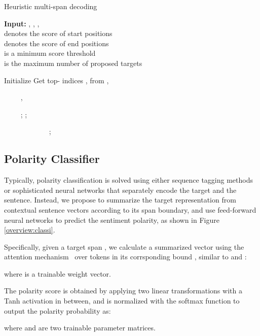 \documentclass[11pt,a4paper]{article}
\begin{document}
\begin{algorithm}[h]
\small
\caption{Heuristic multi-span decoding} \label{algo:hmsd}
{\bf Input:} , , ,  \\
\hspace*{0.15in}  denotes the score of start positions \\
\hspace*{0.15in}  denotes the score of end positions \\
\hspace*{0.15in}  is a minimum score threshold \\
\hspace*{0.15in}  is the maximum number of proposed targets
\begin{algorithmic}[1]
\State Initialize  \State Get top- indices ,  from ,  

  
		\State 
		\State 
		\State , 
		\EndIf
	\EndFor	　　
\EndFor	

 　　\State 
	\State ; ; 

	 　　\If{} 　　　　\State ; 
	　　\EndIf
	\EndFor

\EndWhile
\State \Return 
\end{algorithmic}
\end{algorithm}


\subsection{Polarity Classifier		\label{sec:classi}}
Typically, polarity classification is solved using either sequence tagging methods or sophisticated neural networks that separately encode the target and the sentence.
Instead, we propose to summarize the target representation from contextual sentence vectors according to its span boundary, and use feed-forward neural networks to predict the sentiment polarity, as shown in Figure \ref{overview:classi}.

Specifically, given a target span , we calculate a summarized vector  using the attention mechanism~\cite{bahdanau2014neural} over tokens in its corrsponding bound , similar to \citet{lee2017end} and \citet{he2018jointly}:

where  is a trainable weight vector.

The polarity score is obtained by applying two linear transformations with a Tanh activation in between, and is normalized with the softmax function to output the polarity probability as:

where  and  are two trainable parameter matrices.
\end{document}
